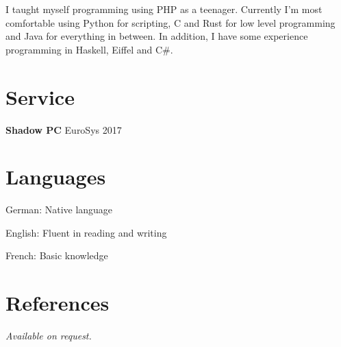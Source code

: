 \documentclass[margin,line]{resume}
\begin{document}
\begin{resume}
I taught myself programming using PHP as a teenager. Currently I'm most
comfortable using Python for scripting, C and Rust for low level programming and
Java for everything in between. In addition, I have some experience programming
in Haskell, Eiffel and C\#.

\section{\mysidestyle Service}
\textbf{Shadow PC} EuroSys 2017 %

\section{\mysidestyle Languages}
\begin{list2}
    \item German: Native language
    \item English: Fluent in reading and writing
    \item French: Basic knowledge
\end{list2}\vspace{-1.5mm}

\pagebreak

\section{\mysidestyle References}
{\sl Available on request.}


\end{resume}
\end{document}
